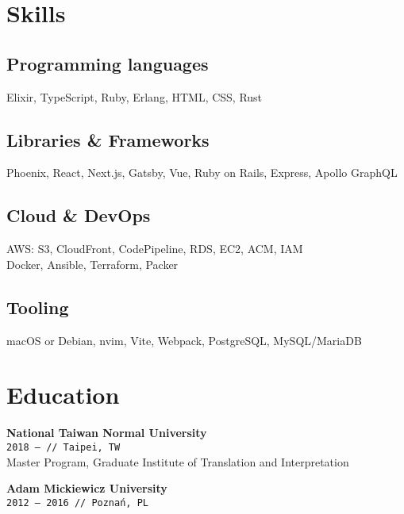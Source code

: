 \documentclass[10pt,a4paper]{article}
\newcommand{\project}[3]{\par\vspace{1em}\textbf{\normalsize #1}\\{\footnotesize\texttt{#2 // #3}}\\[4pt]}
\begin{document}
\begin{minipage}[t]{0.3\textwidth}
  \raggedright
  \section{Skills}

  \subsection{Programming languages}

  \small
  Elixir, TypeScript, Ruby, Erlang, HTML, CSS, Rust
  \vspace{4pt}

  \subsection{Libraries \& Frameworks}

  \small
  Phoenix, React, Next.js, Gatsby, Vue, Ruby on Rails, Express, Apollo GraphQL
  \vspace{4pt}

  \subsection{Cloud \& DevOps}

  \small
  AWS: S3, CloudFront, CodePipeline, RDS, EC2, ACM, IAM\\ Docker, Ansible, Terraform, Packer
  \vspace{4pt}

  \subsection{Tooling}

  \small
  macOS or Debian, nvim, Vite, Webpack, PostgreSQL, MySQL/MariaDB
  \vspace{12pt}

  \section{Education}
  \vspace{-6pt}

  \project{National Taiwan Normal University}{2018 {–}}{Taipei, TW}

  \small Master Program, Graduate Institute of Translation and Interpretation

  \project{Adam Mickiewicz University}{2012 {–} 2016}{Poznań, PL}


\end{minipage}
\end{document}
